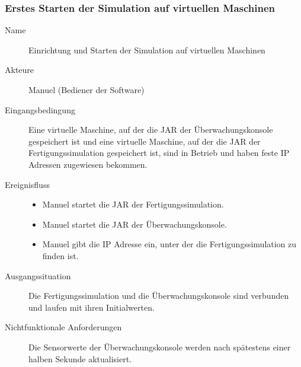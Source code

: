 \documentclass[parskip=full]{scrartcl}
\begin{document}
\subsubsection{Erstes Starten der Simulation auf virtuellen Maschinen}
\begin{description}
 \item[Name] Einrichtung und Starten der Simulation auf virtuellen Maschinen
 \item[Akteure] Manuel (Bediener der Software)
 \item[Eingangsbedingung] Eine virtuelle Maschine, auf der die JAR der Überwachungskonsole gespeichert ist und eine virtuelle Maschine, auf der die JAR der Fertigungssimulation gespeichert ist, sind in Betrieb und haben feste IP Adressen zugewiesen bekommen.
 \item[Ereignisfluss]
 \begin{itemize}[noitemsep]
  \item Manuel startet die JAR der Fertigungssimulation.
  \item Manuel startet die JAR der Überwachungskonsole.
  \item Manuel gibt die IP Adresse ein, unter der die Fertigungssimulation zu finden ist.
 \end{itemize}
 \item[Ausgangssituation] Die Fertigungssimulation und die Überwachungskonsole sind verbunden und laufen mit ihren Initialwerten.
 \item[Nichtfunktionale Anforderungen] Die Sensorwerte der Überwachungskonsole werden nach spätestens einer halben Sekunde aktualisiert.
\end{description}
 
\end{document}

